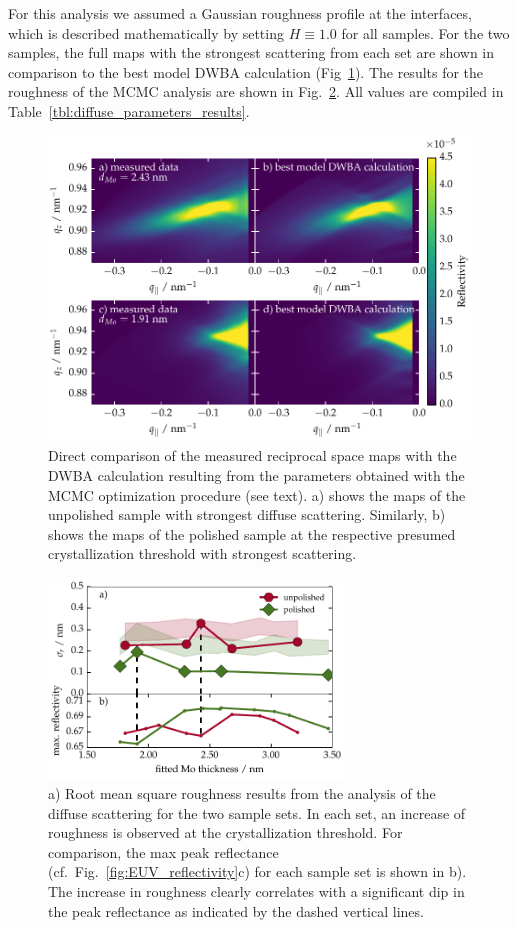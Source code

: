 For this analysis we assumed a Gaussian roughness profile at the interfaces, which is described mathematically by setting $H\equiv1.0$ for all samples. For the two samples, the full maps with the strongest scattering from each set are shown in comparison to the best model DWBA calculation (Fig~\ref{fig:dwba_data_best_model_comparison}). The results for the roughness of the MCMC analysis are shown in Fig.~\ref{fig:PSD_results}. All values are compiled in Table~\ref{tbl:diffuse_parameters_results}. 
\begin{figure}[htbp]
\centering
\includegraphics[width=\textwidth]{img/MoSiC_dwba_data_best_model_comparison}
\caption{Direct comparison of the measured reciprocal space maps with the DWBA calculation resulting from the parameters obtained with the MCMC optimization procedure (see text). a) shows the maps of the unpolished sample with strongest diffuse scattering. Similarly, b) shows the maps of the polished sample at the respective presumed crystallization threshold with strongest scattering.}
\label{fig:dwba_data_best_model_comparison}
\end{figure}
\begin{figure}[htbp]
\centering
\includegraphics[width=0.7\textwidth]{img/MoSiC_PSD_results}
\caption{a) Root mean square roughness results from the analysis of the diffuse scattering for the two sample sets. In each set, an increase of roughness is observed at the crystallization threshold. For comparison, the max peak reflectance (cf.~Fig.~\ref{fig:EUV_reflectivity}c) for each sample set is shown in b). The increase in roughness clearly correlates with a significant dip in the peak reflectance as indicated by the dashed vertical lines.}
\label{fig:PSD_results}
\end{figure}
